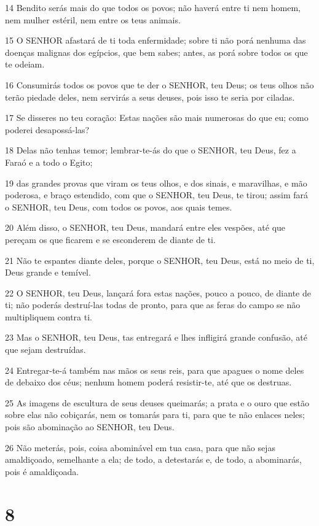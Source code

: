 \par 14 Bendito serás mais do que todos os povos; não haverá entre ti nem homem, nem mulher estéril, nem entre os teus animais.
\par 15 O SENHOR afastará de ti toda enfermidade; sobre ti não porá nenhuma das doenças malignas dos egípcios, que bem sabes; antes, as porá sobre todos os que te odeiam.
\par 16 Consumirás todos os povos que te der o SENHOR, teu Deus; os teus olhos não terão piedade deles, nem servirás a seus deuses, pois isso te seria por ciladas.
\par 17 Se disseres no teu coração: Estas nações são mais numerosas do que eu; como poderei desapossá-las?
\par 18 Delas não tenhas temor; lembrar-te-ás do que o SENHOR, teu Deus, fez a Faraó e a todo o Egito;
\par 19 das grandes provas que viram os teus olhos, e dos sinais, e maravilhas, e mão poderosa, e braço estendido, com que o SENHOR, teu Deus, te tirou; assim fará o SENHOR, teu Deus, com todos os povos, aos quais temes.
\par 20 Além disso, o SENHOR, teu Deus, mandará entre eles vespões, até que pereçam os que ficarem e se esconderem de diante de ti.
\par 21 Não te espantes diante deles, porque o SENHOR, teu Deus, está no meio de ti, Deus grande e temível.
\par 22 O SENHOR, teu Deus, lançará fora estas nações, pouco a pouco, de diante de ti; não poderás destruí-las todas de pronto, para que as feras do campo se não multipliquem contra ti.
\par 23 Mas o SENHOR, teu Deus, tas entregará e lhes infligirá grande confusão, até que sejam destruídas.
\par 24 Entregar-te-á também nas mãos os seus reis, para que apagues o nome deles de debaixo dos céus; nenhum homem poderá resistir-te, até que os destruas.
\par 25 As imagens de escultura de seus deuses queimarás; a prata e o ouro que estão sobre elas não cobiçarás, nem os tomarás para ti, para que te não enlaces neles; pois são abominação ao SENHOR, teu Deus.
\par 26 Não meterás, pois, coisa abominável em tua casa, para que não sejas amaldiçoado, semelhante a ela; de todo, a detestarás e, de todo, a abominarás, pois é amaldiçoada.

\chapter{8}

